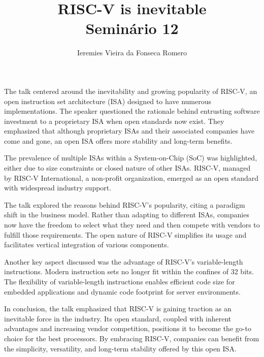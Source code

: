 \documentclass[11pt]{article}
\author{Ieremies Vieira da Fonseca Romero}
\date{}
\title{RISC-V is inevitable\\\medskip
\large Seminário 12}
\begin{document}
\maketitle
The talk centered around the inevitability and growing popularity of RISC-V, an open instruction set architecture (ISA) designed to have numerous implementations. The speaker questioned the rationale behind entrusting software investment to a proprietary ISA when open standards now exist. They emphasized that although proprietary ISAs and their associated companies have come and gone, an open ISA offers more stability and long-term benefits.

The prevalence of multiple ISAs within a System-on-Chip (SoC) was highlighted, either due to size constraints or closed nature of other ISAs. RISC-V, managed by RISC-V International, a non-profit organization, emerged as an open standard with widespread industry support.

The talk explored the reasons behind RISC-V's popularity, citing a paradigm shift in the business model. Rather than adapting to different ISAs, companies now have the freedom to select what they need and then compete with vendors to fulfill those requirements. The open nature of RISC-V simplifies its usage and facilitates vertical integration of various components.

Another key aspect discussed was the advantage of RISC-V's variable-length instructions. Modern instruction sets no longer fit within the confines of 32 bits. The flexibility of variable-length instructions enables efficient code size for embedded applications and dynamic code footprint for server environments.

In conclusion, the talk emphasized that RISC-V is gaining traction as an inevitable force in the industry. Its open standard, coupled with inherent advantages and increasing vendor competition, positions it to become the go-to choice for the best processors. By embracing RISC-V, companies can benefit from the simplicity, versatility, and long-term stability offered by this open ISA.
\end{document}
